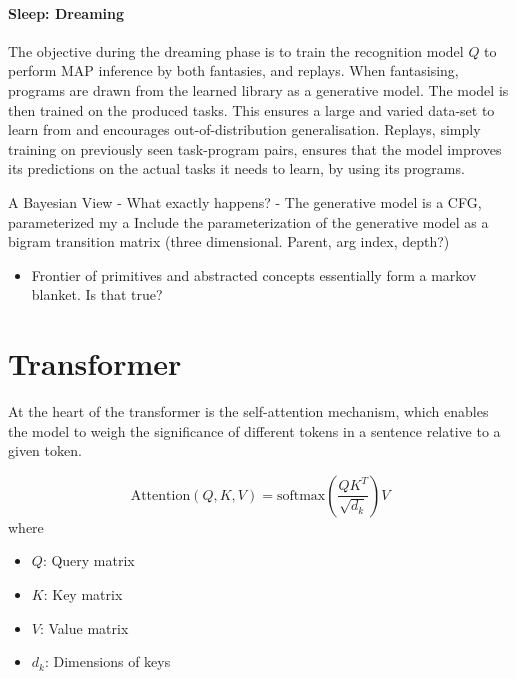 \paragraph{Sleep: Dreaming} The objective during the dreaming phase is to train the recognition model $Q$ to perform MAP inference by both fantasies, and replays. When fantasising, programs are drawn from the learned library as a generative model. The model is then trained on the produced tasks. This ensures a large and varied data-set to learn from and encourages out-of-distribution generalisation. Replays, simply training on previously seen task-program pairs, ensures that the model improves its predictions on the actual tasks it needs to learn, by using its programs.

A Bayesian View
- What exactly happens?
- The generative model is a CFG, parameterized my a 
Include the parameterization of the generative model as a bigram transition matrix (three dimensional. Parent, arg index, depth?)








\begin{itemize}
    \item Frontier of primitives and abstracted concepts essentially form a markov blanket. Is that true? 
\end{itemize}

\section{Transformer}

At the heart of the transformer is the self-attention mechanism, which enables the model to weigh the significance of different tokens in a sentence relative to a given token.

$$ \text{Attention}(Q, K, V) = \text{softmax}(\frac{QK^T}{\sqrt{d_k}})V $$
where
\begin{itemize}
    \item $Q$: Query matrix
    \item $K$: Key matrix 
    \item $V$: Value matrix
    \item $d_k$: Dimensions of keys
\end{itemize}


